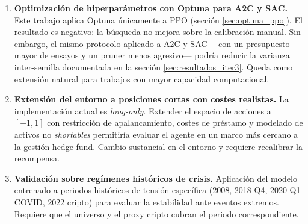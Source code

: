 \documentclass[IB,a4paper]{TFUOC}
\begin{document}
\begin{enumerate}
    El beneficio esperado es doble. Por un lado, mayor estabilidad del agente en regímenes extremos, reduciendo la exposición a la cola izquierda del \textit{drawdown} máximo. Por otro, una posible reducción de la varianza inter-semilla documentada en la sección~\ref{sec:resultados_iter3}: al presentar una secuencia de entrenamiento más estructurada, el espacio de soluciones que el agente puede alcanzar se estrecha, lo que limita la dependencia del resultado final respecto a la inicialización aleatoria.

    La razón por la que esta línea no se ha abordado en el presente trabajo es metodológica: requiere definir \textit{a priori} el orden de los regímenes (tarea no trivial sin un criterio de dificultad objetivo), diseñar criterios de transición entre fases del currículo, y añadir una capa de orquestación al \textit{pipeline} de entrenamiento que excede el presupuesto disponible. El trabajo se ha priorizado en la calibración del agente base, la ablación de la función de recompensa (sección~\ref{sec:resultados_iter2}) y la comparativa multi-algoritmo (sección~\ref{sec:resultados_iter3}). Se deja para trabajos posteriores con mayor capacidad de experimentación.

    \item \textbf{Optimización de hiperparámetros con Optuna para A2C y SAC.} Este trabajo aplica Optuna únicamente a PPO (sección \ref{sec:optuna_ppo}). El resultado es negativo: la búsqueda no mejora sobre la calibración manual. Sin embargo, el mismo protocolo aplicado a A2C y SAC —con un presupuesto mayor de ensayos y un pruner menos agresivo— podría reducir la varianza inter-semilla documentada en la sección \ref{sec:resultados_iter3}. Queda como extensión natural para trabajos con mayor capacidad computacional.

    \item \textbf{Extensión del entorno a posiciones cortas con costes realistas.} La implementación actual es \textit{long-only}. Extender el espacio de acciones a $[-1, 1]$ con restricción de apalancamiento, costes de préstamo y modelado de activos no \textit{shortables} permitiría evaluar el agente en un marco más cercano a la gestión hedge fund. Cambio sustancial en el entorno y requiere recalibrar la recompensa.

    \item \textbf{Validación sobre regímenes históricos de crisis.} Aplicación del modelo entrenado a periodos históricos de tensión específica (2008, 2018-Q4, 2020-Q1 COVID, 2022 cripto) para evaluar la estabilidad ante eventos extremos. Requiere que el universo y el proxy cripto cubran el periodo correspondiente.


\end{enumerate}
\end{document}
